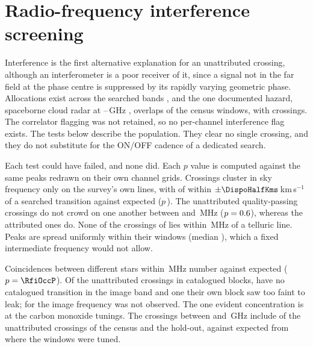 \section{Radio-frequency interference screening}
\label{app:rfi}

Interference is the first alternative explanation for an unattributed
crossing, although an interferometer is a poor receiver of it, since a
signal not in the far field at the phase centre is suppressed by its rapidly
varying geometric phase. Allocations exist across the searched bands
\citep{ITU2024}, and the one documented hazard, spaceborne cloud radar at
\RadarLo--\RadarHi\,GHz \citep{CloudSat2002,EarthCARE2023,ALMAMemo504},
overlaps \RadarNWin{} of the \RadarNTot{} census windows, with \RadarNCross{}
crossings. The correlator
flagging was not retained, so no per-channel interference flag exists. The
tests below describe the population. They clear no single
crossing, and they do not substitute for the ON/OFF cadence of a dedicated
search.

Each test could have failed, and none did. Each $p$ value is computed
against the same peaks redrawn on their own channel grids. Crossings cluster in sky frequency only
on the survey's own lines, with \AppMTubeObs{} of \AppMNCrossF{} within
$\pm\DispoHalfKms$\,km\,s$^{-1}$ of a searched transition against
\AppMTubeNull{} expected ($p$\,\AppMTubeP). The \QcNQP{} unattributed
quality-passing crossings do not crowd on one another between \QcTolLo{} and
\QcTolHi\,MHz ($p=0.6$), whereas the attributed ones do. None of the
\TlNCross{} crossings of \TlCrossPop{} lies within \ScRadMHz\,MHz of a
telluric line. Peaks are spread uniformly within their windows (median
\RfiFracMed), which a fixed intermediate frequency would not allow.

Coincidences between different stars within \RfiOccTol\,MHz number
\RfiOccObs{} against \RfiOccNull{} expected ($p=\RfiOccP$). Of the
\ImNScreen{} unattributed crossings in catalogued blocks, \ImNNoParent{} have
no catalogued transition in the image band and \ImNParentAbsent{} one their
own block saw too faint to leak; for \ImNLeft{} the image frequency was not
observed. The one evident concentration is at the carbon monoxide
tunings. The \TlBandAll{} crossings between \TlBandLo{} and \TlBandHi\,GHz
include \TlBandObs{} of the \TlBandNSub{} unattributed crossings of the
census and the hold-out, against \TlBandNull{} expected from where the
windows were tuned.
